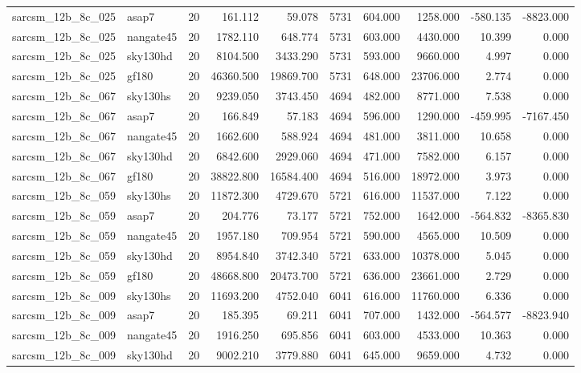 \begin{tabular}{llrrrrrrrr}
sarcsm\_12b\_8c\_025 & asap7 & 20 & 161.112 & 59.078 & 5731 & 604.000 & 1258.000 & -580.135 & -8823.000 \\
sarcsm\_12b\_8c\_025 & nangate45 & 20 & 1782.110 & 648.774 & 5731 & 603.000 & 4430.000 & 10.399 & 0.000 \\
sarcsm\_12b\_8c\_025 & sky130hd & 20 & 8104.500 & 3433.290 & 5731 & 593.000 & 9660.000 & 4.997 & 0.000 \\
sarcsm\_12b\_8c\_025 & gf180 & 20 & 46360.500 & 19869.700 & 5731 & 648.000 & 23706.000 & 2.774 & 0.000 \\
sarcsm\_12b\_8c\_067 & sky130hs & 20 & 9239.050 & 3743.450 & 4694 & 482.000 & 8771.000 & 7.538 & 0.000 \\
sarcsm\_12b\_8c\_067 & asap7 & 20 & 166.849 & 57.183 & 4694 & 596.000 & 1290.000 & -459.995 & -7167.450 \\
sarcsm\_12b\_8c\_067 & nangate45 & 20 & 1662.600 & 588.924 & 4694 & 481.000 & 3811.000 & 10.658 & 0.000 \\
sarcsm\_12b\_8c\_067 & sky130hd & 20 & 6842.600 & 2929.060 & 4694 & 471.000 & 7582.000 & 6.157 & 0.000 \\
sarcsm\_12b\_8c\_067 & gf180 & 20 & 38822.800 & 16584.400 & 4694 & 516.000 & 18972.000 & 3.973 & 0.000 \\
sarcsm\_12b\_8c\_059 & sky130hs & 20 & 11872.300 & 4729.670 & 5721 & 616.000 & 11537.000 & 7.122 & 0.000 \\
sarcsm\_12b\_8c\_059 & asap7 & 20 & 204.776 & 73.177 & 5721 & 752.000 & 1642.000 & -564.832 & -8365.830 \\
sarcsm\_12b\_8c\_059 & nangate45 & 20 & 1957.180 & 709.954 & 5721 & 590.000 & 4565.000 & 10.509 & 0.000 \\
sarcsm\_12b\_8c\_059 & sky130hd & 20 & 8954.840 & 3742.340 & 5721 & 633.000 & 10378.000 & 5.045 & 0.000 \\
sarcsm\_12b\_8c\_059 & gf180 & 20 & 48668.800 & 20473.700 & 5721 & 636.000 & 23661.000 & 2.729 & 0.000 \\
sarcsm\_12b\_8c\_009 & sky130hs & 20 & 11693.200 & 4752.040 & 6041 & 616.000 & 11760.000 & 6.336 & 0.000 \\
sarcsm\_12b\_8c\_009 & asap7 & 20 & 185.395 & 69.211 & 6041 & 707.000 & 1432.000 & -564.577 & -8823.940 \\
sarcsm\_12b\_8c\_009 & nangate45 & 20 & 1916.250 & 695.856 & 6041 & 603.000 & 4533.000 & 10.363 & 0.000 \\
sarcsm\_12b\_8c\_009 & sky130hd & 20 & 9002.210 & 3779.880 & 6041 & 645.000 & 9659.000 & 4.732 & 0.000 \\

\end{tabular}
